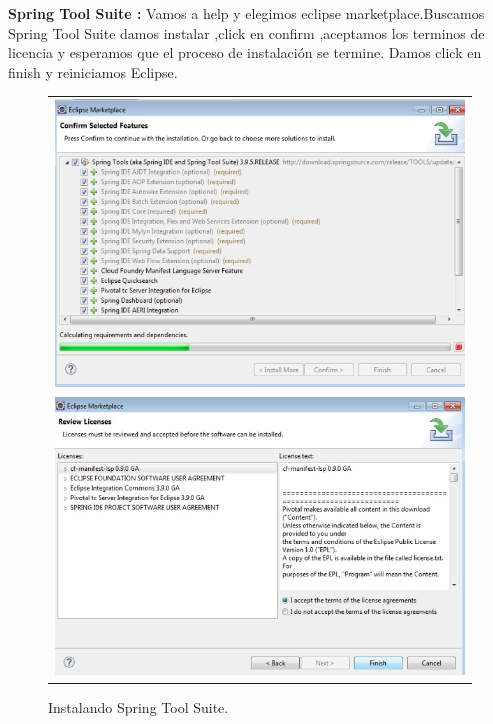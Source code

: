 \textbf{Spring Tool Suite :} Vamos a help y elegimos eclipse  marketplace.Buscamos  Spring Tool Suite  damos instalar ,click en confirm ,aceptamos los terminos de licencia y esperamos que el proceso de instalaci\'on se termine.
Damos click en finish y reiniciamos Eclipse.
\begin{figure}[H]
	\centering
	\begin{tabular}{c}
		\includegraphics[scale=0.9]{images/c13_5.jpg}\\
		\includegraphics[scale=0.9]{images/c13_6.jpg}
	\end{tabular}
	\caption{Instalando  Spring Tool Suite.}
\end{figure}

